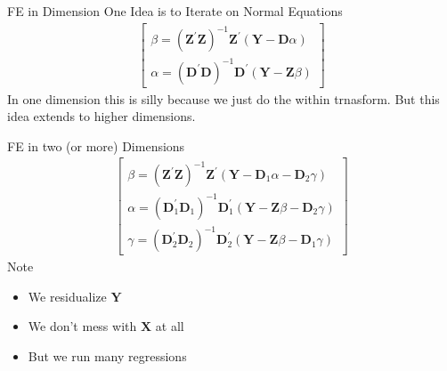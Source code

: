 \begin{frame}{FE in Dimension One}
Idea is to \alert{Iterate on Normal Equations}
\begin{align*}
\left[ \begin{array} { c } { \beta = \left( \mathbf { Z } ^ { \prime } \mathbf { Z } \right) ^ { - 1 } \mathbf { Z } ^ { \prime } ( \mathbf { Y } - \mathbf { D } \alpha ) } \\ { \alpha = \left( \mathbf { D } ^ { \prime } \mathbf { D } \right) ^ { - 1 } \mathbf { D } ^ { \prime } ( \mathbf { Y } - \mathbf { Z } \beta ) } \end{array} \right]
\end{align*}
In one dimension this is silly because we just do the \alert{within trnasform}. But this idea extends to higher dimensions.
\end{frame}

\begin{frame}{FE in two (or more) Dimensions}
\begin{align*}
\left[ \begin{array} { c } { \beta = \left( \mathbf { Z } ^ { \prime } \mathbf { Z } \right) ^ { - 1 } \mathbf { Z } ^ { \prime } \left( \mathbf { Y } - \mathbf { D } _ { 1 } \alpha - \mathbf { D } _ { 2 } \gamma \right) } \\ { \alpha = \left( \mathbf { D } _ { 1 } ^ { \prime } \mathbf { D } _ { 1 } \right) ^ { - 1 } \mathbf { D } _ { 1 } ^ { \prime } \left( \mathbf { Y } - \mathbf { Z } \beta - \mathbf { D } _ { 2 } \gamma \right) } \\ { \gamma = \left( \mathbf { D } _ { 2 } ^ { \prime } \mathbf { D } _ { 2 } \right) ^ { - 1 } \mathbf { D } _ { 2 } ^ { \prime } \left( \mathbf { Y } - \mathbf { Z } \beta - \mathbf { D } _ { 1 } \gamma \right) } \end{array} \right]
\end{align*}
Note
\begin{itemize}
\item We residualize $\mathbf{Y}$
\item We don't mess with $\mathbf{X}$ at all
\item But we run many regressions
\end{itemize}
\end{frame}

